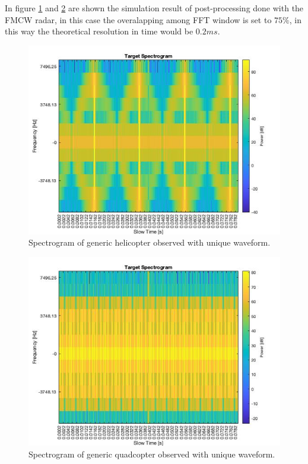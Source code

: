 In figure \ref{generic_f-t_helic_unique} and \ref{generic_f-t_quad_unique} are shown the simulation result of post-processing done with the FMCW radar, in this case the overalapping among FFT window is set to $75\%$, in this way the theoretical resolution in time would be $0.2ms$.

\begin{figure}[h!]
\centering
\includegraphics[width=12cm]{FMCW mD analysis-chap4/img/helic_unique_ft.jpg}
\caption{Spectrogram of generic helicopter observed with unique waveform.}
\label{generic_f-t_helic_unique}
\end{figure}

\begin{figure}[h!]
\centering
\includegraphics[width=12cm]{FMCW mD analysis-chap4/img/quad_unique_wave_ft.jpg}
\caption{Spectrogram of generic quadcopter observed with unique waveform.}
\label{generic_f-t_quad_unique}
\end{figure}

